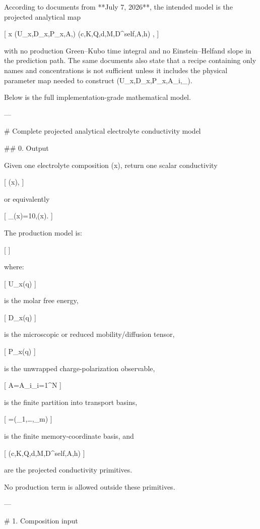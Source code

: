 According to documents from **July 7, 2026**, the intended model is the projected analytical map

[
x
\longmapsto
(U_x,D_x,P_x,\mathcal A,\Psi)
\longmapsto
(c,K,Q,d,M,D^{\rm self},A,h)
\longmapsto
\sigma,
]

with no production Green–Kubo time integral and no Einstein–Helfand slope in the prediction path. The same documents also state that a recipe containing only names and concentrations is not sufficient unless it includes the physical parameter map needed to construct (U_x,D_x,P_x,A_i,\psi_\alpha). 

Below is the full implementation-grade mathematical model.

---

# Complete projected analytical electrolyte conductivity model

## 0. Output

Given one electrolyte composition (x), return one scalar conductivity

[
\sigma(x)\quad [\mathrm{S,m^{-1}}],
]

or equivalently

[
\sigma_{}(x)=10,\sigma(x).
]

The production model is:

[
]

where:

[
U_x(q)
]

is the molar free energy,

[
D_x(q)
]

is the microscopic or reduced mobility/diffusion tensor,

[
P_x(q)
]

is the unwrapped charge-polarization observable,

[
\mathcal A={A_i}_{i=1}^N
]

is the finite partition into transport basins,

[
\Psi=(\psi_1,\ldots,\psi_m)
]

is the finite memory-coordinate basis, and

[
(c,K,Q,d,M,D^{\rm self},A,h)
]

are the projected conductivity primitives.

No production term is allowed outside these primitives.

---

# 1. Composition input

